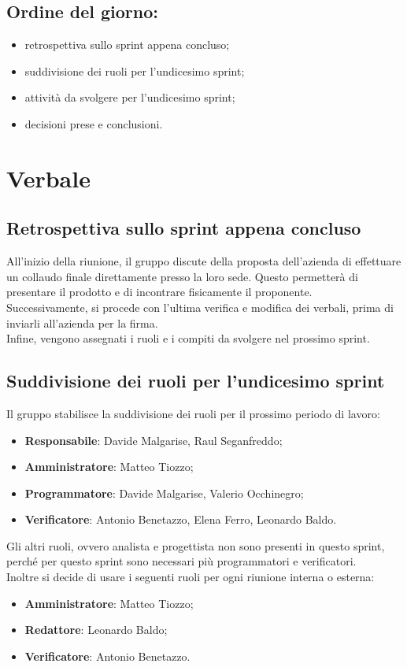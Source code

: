 \documentclass[italian,12pt]{article}
\begin{document}
\subsection*{Ordine del giorno:}
\begin{itemize}
	\item retrospettiva sullo sprint appena concluso;
	\item suddivisione dei ruoli per l'undicesimo sprint;
	\item attività da svolgere per l'undicesimo sprint;
	\item decisioni prese e conclusioni.
\end{itemize}


\newpage

\section{Verbale}

\subsection{Retrospettiva sullo sprint appena concluso}
All'inizio della riunione, il gruppo discute della proposta dell'azienda di effettuare un collaudo finale direttamente presso la loro sede. Questo permetterà di presentare il prodotto e di incontrare fisicamente il proponente. \\
Successivamente, si procede con l'ultima verifica e modifica dei verbali, prima di inviarli all'azienda per la firma. \\
Infine, vengono assegnati i ruoli e i compiti da svolgere nel prossimo sprint.

\subsection{Suddivisione dei ruoli per l'undicesimo sprint}
Il gruppo stabilisce la suddivisione dei ruoli per il prossimo periodo di lavoro:
\begin{itemize}
	\item \textbf{Responsabile}: Davide Malgarise, Raul Seganfreddo;
	\item \textbf{Amministratore}: Matteo Tiozzo;
	\item \textbf{Programmatore}: Davide Malgarise, Valerio Occhinegro;
	\item \textbf{Verificatore}: Antonio Benetazzo, Elena Ferro, Leonardo Baldo.
\end{itemize}
Gli altri ruoli, ovvero analista e progettista non sono presenti in questo sprint, perché per questo sprint sono necessari più programmatori e verificatori. \\ %
Inoltre si decide di usare i seguenti ruoli per ogni riunione interna o esterna:
\begin{itemize}
	\item \textbf{Amministratore}: Matteo Tiozzo;
	\item \textbf{Redattore}: Leonardo Baldo;
	\item \textbf{Verificatore}: Antonio Benetazzo.
\end{itemize}
\end{document}

